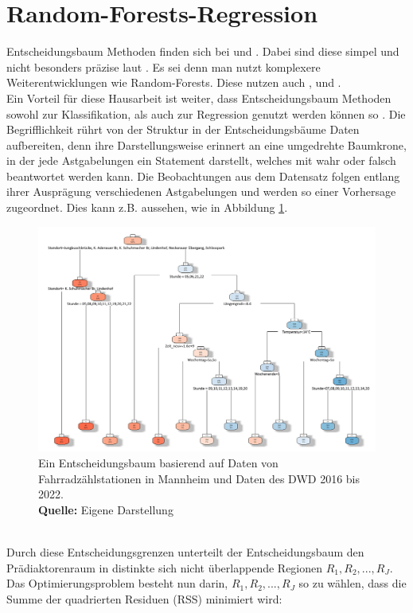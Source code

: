 \documentclass[a4paper,12pt]{thesis}
\newcommand*{\captionsource}[2]{%
	\caption[{#1}]{%
		#1%
		\\\hspace{\linewidth}%
		\textbf{Quelle:} #2%
	}%
}
\begin{document}
\section{Random-Forests-Regression}

Entscheidungsbaum Methoden finden sich bei \cite{Mitchell2018PredictingBT} und \cite{Gao2022}. Dabei sind diese simpel und nicht besonders präzise laut \cite{James2013TBM}. Es sei denn man nutzt komplexere Weiterentwicklungen wie Random-Forests. Diese nutzen auch \cite{Holmgren2017}, \cite{Broucke2019} und \cite{Mitchell2018PredictingBT}.\\ 
Ein Vorteil für diese Hausarbeit ist weiter, dass Entscheidungsbaum Methoden sowohl zur Klassifikation, als auch zur Regression genutzt werden können so \cite{James2013TBM}. Die Begrifflichkeit rührt von der Struktur in der Entscheidungsbäume Daten aufbereiten, denn ihre Darstellungsweise erinnert an eine umgedrehte Baumkrone, in der jede Astgabelungen ein Statement darstellt, welches mit wahr oder falsch beantwortet werden kann. Die Beobachtungen aus dem Datensatz folgen entlang ihrer Ausprägung verschiedenen Astgabelungen und werden so einer Vorhersage zugeordnet. Dies kann z.B. aussehen, wie in Abbildung \ref{DTM1}.
\begin{figure}[!ht]
	\centering
	\includegraphics[width=16cm]{Plots/Entscheidungsbaum.png}
	\captionsource{Ein Entscheidungsbaum basierend auf Daten von Fahrradzählstationen in Mannheim und Daten des DWD 2016 bis 2022.}{
		Eigene Darstellung
	}
	\label{DTM1}
\end{figure}\\
Durch diese Entscheidungsgrenzen unterteilt der Entscheidungsbaum den Prädiaktorenraum in distinkte sich nicht überlappende Regionen $R_1,R_2,...,R_J$. Das Optimierungsproblem besteht nun darin, $R_1,R_2,...,R_J$ so zu wählen, dass die Summe der quadrierten Residuen (RSS) minimiert wird: 
\end{document}
